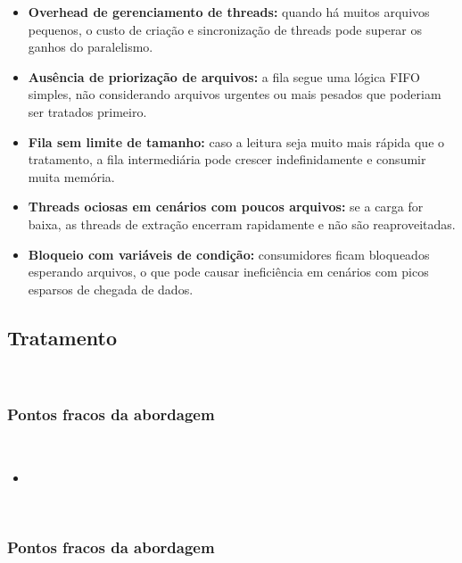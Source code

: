 \documentclass[a4paper,12pt]{article}
\begin{document}
\begin{itemize}
    \item \textbf{Overhead de gerenciamento de threads:} quando há muitos arquivos pequenos, o custo de criação e sincronização de threads pode superar os ganhos do paralelismo.

    \item \textbf{Ausência de priorização de arquivos:} a fila segue uma lógica FIFO simples, não considerando arquivos urgentes ou mais pesados que poderiam ser tratados primeiro.

    \item \textbf{Fila sem limite de tamanho:} caso a leitura seja muito mais rápida que o tratamento, a fila intermediária pode crescer indefinidamente e consumir muita memória.

    \item \textbf{Threads ociosas em cenários com poucos arquivos:} se a carga for baixa, as threads de extração encerram rapidamente e não são reaproveitadas.

    \item \textbf{Bloqueio com variáveis de condição:} consumidores ficam bloqueados esperando arquivos, o que pode causar ineficiência em cenários com picos esparsos de chegada de dados.

\end{itemize}

\subsection*{Tratamento}
\\



\subsubsection*{Pontos fracos da abordagem}
\\
\begin{itemize}
    \item \textbf{} 
    
\end{itemize}

\vspace{1em}

\\
\subsubsection*{Pontos fracos da abordagem}
\end{document}
